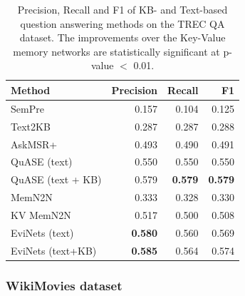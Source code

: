 \begin{table}
\centering
\begin{tabular}{p{6cm}rrr}
Method & Precision & Recall & F1 \\
\hline
SemPre & 0.157 & 0.104 & 0.125 \\
Text2KB & 0.287 & 0.287 & 0.288 \\
AskMSR+ & 0.493 & 0.490 & 0.491 \\
QuASE (text) & 0.550 & 0.550 & 0.550 \\
QuASE (text + KB) & 0.579 & \textbf{0.579} & \textbf{0.579} \\
\hline
MemN2N & 0.333 & 0.328 & 0.330 \\
KV MemN2N & 0.517 & 0.500 & 0.508 \\
\hline
EviNets (text) & \textbf{0.580} & 0.560 & 0.569 \\
EviNets (text+KB) & \textbf{0.585} & 0.564 & 0.574 \\
\end{tabular}
\caption{Precision, Recall and F1 of KB- and Text-based question answering methods on the TREC QA dataset. The improvements over the Key-Value memory networks are statistically significant at p-value $<$ 0.01.}
\label{table:factoid:evinet:eval:trecqa}
\end{table}

\subsubsection{WikiMovies dataset}
\label{section:factoid:evinet:eval:wikimovies}

